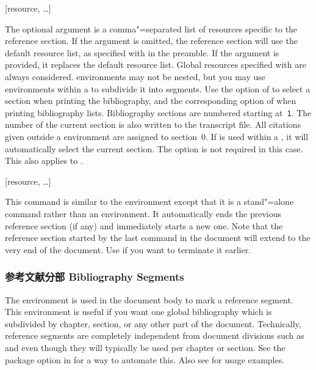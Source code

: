 \begin{ltxsyntax}

[resource, \dots]

The optional argument is a comma"=separated list of resources specific to the reference section. If the argument is omitted, the reference section will use the default resource list, as specified with  in the preamble. If the argument is provided, it replaces the default resource list. Global resources specified with  are always considered.  environments may not be nested, but you may use  environments within a  to subdivide it into segments. Use the  option of  to select a section when printing the bibliography, and the corresponding option of  when printing bibliography lists. Bibliography sections are numbered starting at~\texttt{1}. The number of the current section is also written to the transcript file. All citations given outside a  environment are assigned to section~0. If  is used within a , it will automatically select the current section. The  option is not required in this case. This also applies to .

[resource, \dots]

This command is similar to the  environment except that it is a stand"=alone command rather than an environment. It automatically ends the previous reference section (if any) and immediately starts a new one. Note that the reference section started by the last  command in the document will extend to the very end of the document. Use  if you want to terminate it earlier.

\end{ltxsyntax}

\subsubsection{参考文献分部 Bibliography Segments}
\label{use:bib:seg}

The  environment is used in the document body to mark a reference segment. This environment is useful if you want one global bibliography which is subdivided by chapter, section, or any other part of the document. Technically, reference segments are completely independent from document divisions such as  and  even though they will typically be used per chapter or section. See the  package option in  for a way to automate this. Also see  for usage examples.

